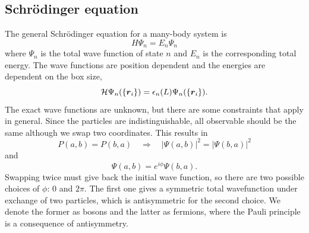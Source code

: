 \documentclass[norsk,a4paper,12pt]{article}
\begin{document}
\subsection{Schrödinger equation}
The general Schrödinger equation for a many-body system is 
\begin{equation}
H\Psi_n=E_n\Psi_n
\end{equation}
where $\Psi_n$ is the total wave function of state $n$ and $E_n$ is the corresponding total energy. The wave functions are position dependent and the energies are dependent on the box size,
\begin{equation}
{\cal H}\Psi_n(\{\boldsymbol{r}_i\})=\epsilon_n(L)\Psi_n(\{\boldsymbol{r}_i\}).
\end{equation}
The exact wave functions are unknown, but there are some constraints that apply in general. Since the particles are indistinguishable, all observable should be the same although we swap two coordinates. This results in
\begin{equation}
P(a,b)=P(b,a)\quad\Rightarrow\quad |\Psi(a,b)|^2=|\Psi(b,a)|^2
\end{equation}
and
\begin{equation}
\Psi(a,b)=e^{i\phi}\Psi(b,a).
\end{equation}
Swapping twice must give back the initial wave function, so there are two possible choices of $\phi$: 0 and $2\pi$. The first one gives a symmetric total wavefunction under exchange of two particles, which is antisymmetric for the second choice. We denote the former as bosons and the latter as fermions, where the Pauli principle is a consequence of antisymmetry.
\end{document}
